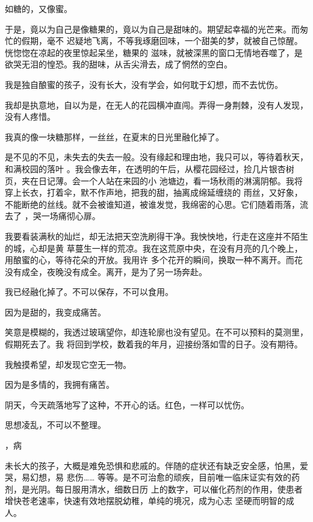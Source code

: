 \documentclass[12pt,a4paper]{article}
\newcommand{\subpart}[1]{
	\begingroup \par
	\vspace{1ex} \centering #1
	\par \endgroup
}
\begin{document}
		如糖的，又像蜜。

		于是，竟以为自己是像糖果的，竟以为自己是甜味的。期望起幸福的光芒来。而匆忙的假期，毫不
	迟疑地飞离，不等我琢磨回味，一个甜美的梦，就被自己惊醒。恍惚惚在凉起的夜里惊起呆坐，糖果的
	滋味，就被深黑的窗口无情地吞噬了，是欲哭无泪的惶恐。我的甜味，从舌尖滑去，成了惘然的空白。

		我是独自酿蜜的孩子，没有长大，没有学会，如何耽于幻想，而不去忧伤。

		我却是执意地，自以为是，在无人的花园横冲直闯。弄得一身荆棘，没有人发现，没有人疼惜。

		我真的像一块糖那样，一丝丝，在夏末的日光里融化掉了。

		是不见的不见，未失去的失去一般。没有缘起和理由地，我只可以，等待着秋天，和满校园的落叶
	。我会像去年，在透明的午后，从樱花园经过，捡几片银杏树页，夹在日记薄。会一个人站在来园的小
	池塘边，看一场秋雨的淋漓阴郁。我将穿上长衣，打着伞，默不作声地，把我的甜，抽离成绵延缠绕的
	雨丝，又好象，不能断绝的丝线。就不会被谁知道，被谁发觉，我绵密的心思。它们随着雨落，流去了
	，哭一场痛彻心扉。


		我要看装满秋的灿烂，却无法把天空洗刷得干净。我怏怏地，行走在这座并不陌生的城，心却是黄
	草蔓生一样的荒凉。我在这荒原中央，在没有月亮的几个晚上，用酿蜜的心，等待花朵的开放。我用许
	多个花开的瞬间，换取一种不离开。而花没有成全，夜晚没有成全。离开，是为了另一场奔赴。

		我已经融化掉了。不可以保存，不可以食用。

		因为是甜的，我变成痛苦。

		笑意是模糊的，我透过玻璃望你，却连轮廓也没有望见。在不可以预料的莫测里，假期死去了。我
	将回到学校，数着我的年月，迎接纷落如雪的日子。没有期待。

		我触摸希望，却发现它空无一物。

		因为是多情的，我拥有痛苦。

		阴天，今天疏落地写了这种，不开心的话。红色，一样可以忧伤。

	\endwriting



		思想凌乱，不可以不整理。

		\subpart{1，病}

		未长大的孩子，大概是难免恐惧和悲戚的。伴随的症状还有缺乏安全感，怕黑，爱哭，易幻想，易
	悲伤…… 等等。是不可治愈的顽疾，目前唯一临床证实有效的药剂，是光阴。每日服用清水，细数日历
	上的数字，可以催化药剂的作用，使患者增快苍老速率，快速有效地摆脱幼稚，单纯的境况，成为心志
	坚硬而明智的成人。
\end{document}
